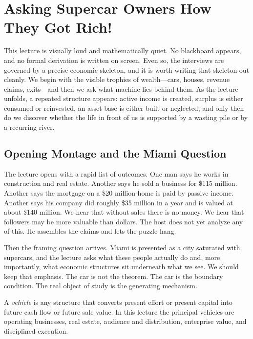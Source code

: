 \chapter{Asking Supercar Owners How They Got Rich!}

This lecture is visually loud and mathematically quiet. No blackboard appears, and no formal derivation is written on screen. Even so, the interviews are governed by a precise economic skeleton, and it is worth writing that skeleton out cleanly. We begin with the visible trophies of wealth---cars, houses, revenue claims, exits---and then we ask what machine lies behind them. As the lecture unfolds, a repeated structure appears: active income is created, surplus is either consumed or reinvested, an asset base is either built or neglected, and only then do we discover whether the life in front of us is supported by a wasting pile or by a recurring river.

\section{Opening Montage and the Miami Question}

The lecture opens with a rapid list of outcomes. One man says he works in construction and real estate. Another says he sold a business for \$115 million. Another says the mortgage on a \$20 million home is paid by passive income. Another says his company did roughly \$35 million in a year and is valued at about \$140 million. We hear that without sales there is no money. We hear that followers may be more valuable than dollars. The host does not yet analyze any of this. He assembles the claims and lets the puzzle hang.

Then the framing question arrives. Miami is presented as a city saturated with supercars, and the lecture asks what these people actually do and, more importantly, what economic structures sit underneath what we see. We should keep that emphasis. The car is not the theorem. The car is the boundary condition. The real object of study is the generating mechanism.

\begin{definition}
A \emph{vehicle} is any structure that converts present effort or present capital into future cash flow or future sale value. In this lecture the principal vehicles are operating businesses, real estate, audience and distribution, enterprise value, and disciplined execution.
\end{definition}

